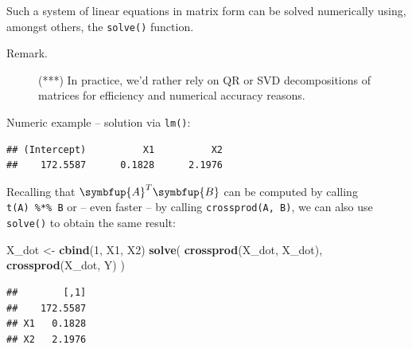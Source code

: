 \documentclass[10pt,b5paper,krantz1]{krantz}
\newenvironment{Shaded}{\begin{snugshade}}{\end{snugshade}}
\newcommand{\DecValTok}[1]{\textcolor[rgb]{0.06,0.06,0.06}{#1}}
\newcommand{\KeywordTok}[1]{\textcolor[rgb]{0.27,0.27,0.27}{\textbf{#1}}}
\newcommand{\NormalTok}[1]{#1}
\newcommand{\OperatorTok}[1]{\textcolor[rgb]{0.43,0.43,0.43}{\textbf{#1}}}
\newcommand{\StringTok}[1]{\textcolor[rgb]{0.5,0.5,0.5}{#1}}
\renewcommand{\mathbf}[1]{\symbfup{#1}}
\begin{document}
Such a system of linear equations in matrix form can be solved numerically using,
amongst others, the \texttt{solve()} function.

\begin{description}
\item[Remark.]
(***) In practice, we'd rather rely on QR or SVD decompositions
of matrices for efficiency and numerical accuracy reasons.
\end{description}

Numeric example -- solution via \texttt{lm()}:

\begin{Shaded}
\end{Shaded}

\begin{verbatim}
## (Intercept)          X1          X2 
##    172.5587      0.1828      2.1976
\end{verbatim}

Recalling that \(\mathbf{A}^T \mathbf{B}\) can be computed
by calling \texttt{t(A)\ \%*\%\ B} or -- even faster -- by calling \texttt{crossprod(A,\ B)},
we can also use \texttt{solve()} to obtain the same result:

\begin{Shaded}
\begin{Highlighting}[]
\NormalTok{X_dot <-}\StringTok{ }\KeywordTok{cbind}\NormalTok{(}\DecValTok{1}\NormalTok{, X1, X2)}
\KeywordTok{solve}\NormalTok{( }\KeywordTok{crossprod}\NormalTok{(X_dot, X_dot), }\KeywordTok{crossprod}\NormalTok{(X_dot, Y) )}
\end{Highlighting}
\end{Shaded}

\begin{verbatim}
##        [,1]
##    172.5587
## X1   0.1828
## X2   2.1976
\end{verbatim}
\end{document}

